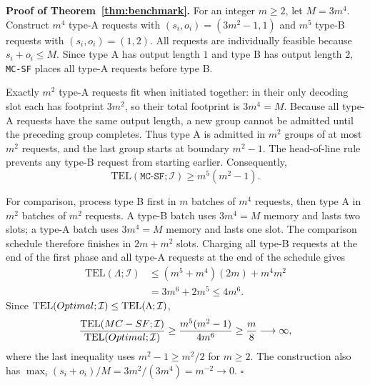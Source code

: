 \documentclass[10pt,a4paper]{amsart}
\renewenvironment{proof}[1]{\par\medskip\noindent\textbf{#1}\enspace\ignorespaces}{\par\medskip}
\newcommand{\Halmos}{\hfill$\square$}
\newcommand{\mcsdf}{\texttt{MC-SF}}
\newcommand{\opt}{\texttt{Optimal}}
\begin{document}
\begin{proof}{Proof of Theorem~\ref{thm:benchmark}.}
For an integer $m\ge2$, let $M=3m^4$. Construct $m^4$ type-A requests
with $(s_i,o_i)=(3m^2-1,1)$ and $m^5$ type-B requests with
$(s_i,o_i)=(1,2)$. All requests are individually feasible because
$s_i+o_i\le M$. Since type A has output length $1$ and type B has output
length $2$, \mcsdf{} places all type-A requests before type B.

Exactly $m^2$ type-A requests fit when initiated together: in their only
decoding slot each has footprint $3m^2$, so their total footprint is
$3m^4=M$. Because all type-A requests have the same output length, a new
group cannot be admitted until the preceding group completes. Thus type A
is admitted in $m^2$ groups of at most $m^2$ requests, and the last group
starts at boundary $m^2-1$. The head-of-line rule prevents any type-B
request from starting earlier. Consequently,
\[
\mathrm{TEL}(\mcsdf;\mathcal I)
\ge m^5(m^2-1).
\]

For comparison, process type B first in $m$ batches of $m^4$ requests,
then type A in $m^2$ batches of $m^2$ requests. A type-B batch uses
$3m^4=M$ memory and lasts two slots; a type-A batch uses $3m^4=M$
memory and lasts one slot. The comparison schedule therefore finishes
in $2m+m^2$ slots. Charging all type-B requests at the end of the first
phase and all type-A requests at the end of the schedule gives
\[
\begin{aligned}
\mathrm{TEL}(\Lambda;\mathcal I)
&\le (m^5+m^4)(2m)+m^4m^2\\
&=3m^6+2m^5\le4m^6.
\end{aligned}
\]
Since $\mathrm{TEL}(\textup{\opt};\mathcal I)\le
\mathrm{TEL}(\Lambda;\mathcal I)$,
\[
\frac{\mathrm{TEL}(\mcsdf;\mathcal I)}
     {\mathrm{TEL}(\textup{\opt};\mathcal I)}
\ge\frac{m^5(m^2-1)}{4m^6}
\ge\frac m8\longrightarrow\infty,
\]
where the last inequality uses $m^2-1\ge m^2/2$ for $m\ge2$.
The construction also has
$\max_i(s_i+o_i)/M=3m^2/(3m^4)=m^{-2}\to0$.
\Halmos
\end{proof}
\end{document}
